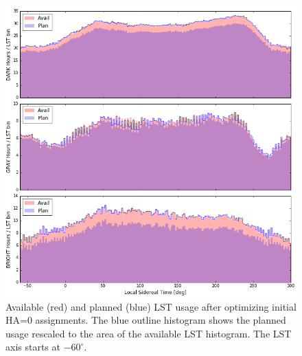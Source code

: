 \documentclass[12pt]{article}
\begin{document}
\begin{figure}[htb]
\begin{center}
\includegraphics[width=6in]{LST_zero}
\caption{Available (red) and planned (blue) LST usage after optimizing initial HA=0 assignments.  The blue outline histogram shows the planned usage rescaled to the area of the available LST histogram.  The LST axis starts at $-60^\circ$.}
\label{fig:LST_zero}
\end{center}
\end{figure}
\end{document}
